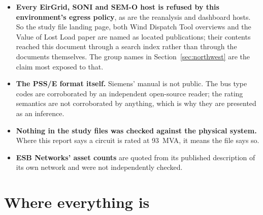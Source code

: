\documentclass[11pt,a4paper]{article}
\begin{document}
\begin{itemize}
\item \textbf{Every EirGrid, SONI and SEM-O host is refused by this
      environment's egress policy}, as are the reanalysis and dashboard hosts.
      So the study file landing page, both Wind Dispatch Tool overviews and the
      Value of Lost Load paper are named as located publications; their
      contents reached this document through a search index rather than through
      the documents themselves. The group names in Section~\ref{sec:northwest} are the
      claim most exposed to that.
\item \textbf{The PSS/E format itself.} Siemens' manual is not public. The bus
      type codes are corroborated by an independent open-source reader; the rating semantics are not corroborated by
      anything, which is why they are presented as an inference.
\item \textbf{Nothing in the study files was checked against the physical
      system.} Where this report says a circuit is rated at 93~MVA, it means
      the file says so.
\item \textbf{ESB Networks' asset counts} are quoted from its published
      description of its own network and were not independently checked.
\end{itemize}

\clearpage
\section{Where everything is}
\end{document}
